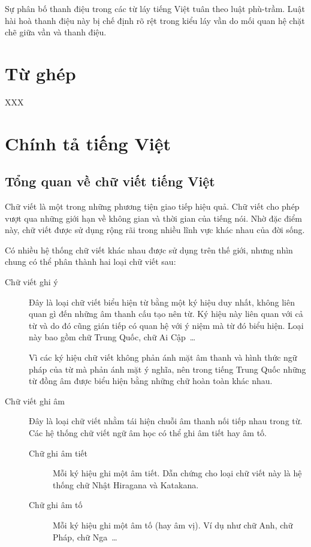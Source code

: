 \documentclass[a4paper,oneside,14pt]{extbook} %
\begin{document}
Sự phân bố thanh điệu trong các từ láy tiếng Việt tuân theo luật
phù-trầm. Luật hài hoà thanh điệu này bị chế định rõ rệt trong kiểu
láy vần do mối quan hệ chặt chẽ giữa vần và thanh điệu.

\section{Từ ghép}

XXX

\section{Chính tả tiếng Việt}


\subsection{Tổng quan về chữ viết tiếng Việt}



Chữ viết là một trong những phương tiện giao tiếp hiệu quả. Chữ viết
cho phép vượt qua những giới hạn về không gian và thời gian của tiếng
nói. Nhờ đặc điểm này, chữ viết được sử dụng rộng rãi trong nhiều lĩnh
vực khác nhau của đời sống.

Có nhiều hệ thống chữ viết khác nhau được sử dụng trên thế giới, nhưng
nhìn chung có thể phân thành hai loại chữ viết sau:
\begin{description}
\item[Chữ viết ghi ý] Đây là loại chữ viết biểu hiện từ bằng một ký
  hiệu duy nhất, không liên quan gì đến những âm thanh cấu tạo nên
  từ. Ký hiệu này liên quan với cả từ và do đó cũng gián tiếp có quan
  hệ với ý niệm mà từ đó biểu hiện. Loại này bao gồm chữ Trung Quốc, chữ Ai
  Cập~\ldots{}

  Vì các ký hiệu chữ viết không phản ánh mặt âm thanh và hình thức ngữ
  pháp của từ mà phản ánh mặt ý nghĩa, nên trong tiếng Trung Quốc
  những từ đồng âm được biểu hiện bằng những chữ hoàn toàn khác nhau.

\item[Chữ viết ghi âm] Đây là loại chữ viết nhằm tái hiện chuỗi âm
  thanh nối tiếp nhau trong từ. Các hệ thống chữ viết ngữ âm học có
  thể ghi âm tiết hay âm tố.
  \begin{description}
  \item[Chữ ghi âm tiết] Mỗi ký hiệu ghi một âm tiết. Dẫn chứng cho
  loại chữ viết này là hệ thống chữ Nhật Hiragana và Katakana.

  \item[Chữ ghi âm tố] Mỗi ký hiệu ghi một âm tố (hay âm vị). Ví dụ
  như chữ Anh, chữ Pháp, chữ Nga~\ldots{}

  \end{description}
\end{description}
\end{document}
